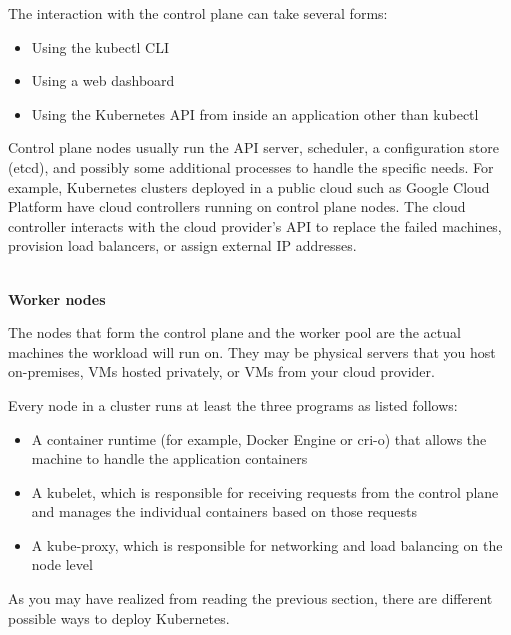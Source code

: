 The interaction with the control plane can take several forms:

\begin{itemize}
\item 
Using the kubectl CLI

\item 
Using a web dashboard

\item 
Using the Kubernetes API from inside an application other than kubectl
\end{itemize}

Control plane nodes usually run the API server, scheduler, a configuration store (etcd), and possibly some additional processes to handle the specific needs. For example, Kubernetes clusters deployed in a public cloud such as Google Cloud Platform have cloud controllers running on control plane nodes. The cloud controller interacts with the cloud provider's API to replace the failed machines, provision load balancers, or assign external IP addresses.

\hspace*{\fill} \\ %
\noindent
\textbf{Worker nodes}

The nodes that form the control plane and the worker pool are the actual machines the workload will run on. They may be physical servers that you host on-premises, VMs hosted privately, or VMs from your cloud provider.

Every node in a cluster runs at least the three programs as listed follows:

\begin{itemize}
\item 
A container runtime (for example, Docker Engine or cri-o) that allows the machine to handle the application containers

\item 
A kubelet, which is responsible for receiving requests from the control plane and manages the individual containers based on those requests

\item 
A kube-proxy, which is responsible for networking and load balancing on the node level
\end{itemize}


As you may have realized from reading the previous section, there are different possible ways to deploy Kubernetes.

